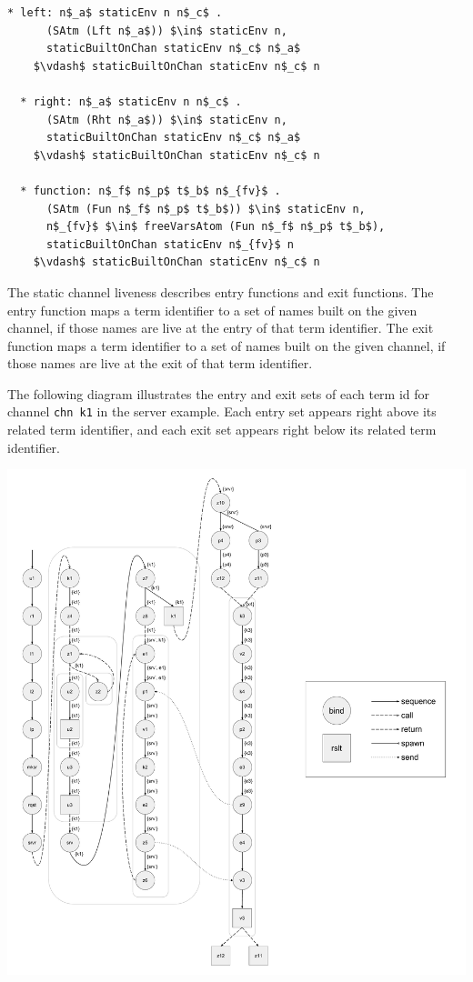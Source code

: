 \documentclass[letterpaper, 11pt]{report}
\begin{document}
\begin{lstlisting}[language=logic, mathescape]
  * left: n$_a$ staticEnv n n$_c$ .
      (SAtm (Lft n$_a$)) $\in$ staticEnv n,
      staticBuiltOnChan staticEnv n$_c$ n$_a$
    $\vdash$ staticBuiltOnChan staticEnv n$_c$ n

  * right: n$_a$ staticEnv n n$_c$ .
      (SAtm (Rht n$_a$)) $\in$ staticEnv n,
      staticBuiltOnChan staticEnv n$_c$ n$_a$
    $\vdash$ staticBuiltOnChan staticEnv n$_c$ n

  * function: n$_f$ n$_p$ t$_b$ n$_{fv}$ .
      (SAtm (Fun n$_f$ n$_p$ t$_b$)) $\in$ staticEnv n,
      n$_{fv}$ $\in$ freeVarsAtom (Fun n$_f$ n$_p$ t$_b$),
      staticBuiltOnChan staticEnv n$_{fv}$ n
    $\vdash$ staticBuiltOnChan staticEnv n$_c$ n
\end{lstlisting}

The static channel liveness describes entry functions and exit functions.
The entry function maps a term identifier to a set of names built on
the given channel, if those names are live at the entry of that term identifier.
The exit function maps a term identifier to a
set of names built on the given channel, if those names are live at the exit of that
term identifier.

The following diagram illustrates the entry and exit sets of each term id
for channel \lstinline{chn k1} in the server example.
Each entry set appears right above its related term identifier,
and each exit set appears right below its related term identifier. 

\includegraphics[width=1\textwidth]{cml-liveness-analysis-k1.pdf}
\end{document}
